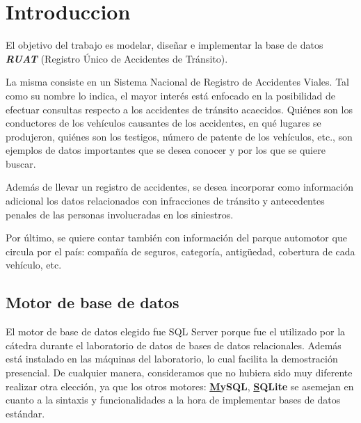 \section{Introduccion}

El objetivo del trabajo es modelar, dise\~nar e implementar la base de datos \textbf{\emph{RUAT}}
(Registro Único de Accidentes de Tránsito).

La misma consiste en un Sistema Nacional de Registro de Accidentes Viales. Tal como su nombre lo indica, el mayor interés
está enfocado en la posibilidad de efectuar consultas respecto a los accidentes de tránsito acaecidos. Quiénes son los
conductores de los vehículos causantes de los accidentes, en qué lugares se produjeron, quiénes son los testigos,
número de patente de los vehículos, etc., son ejemplos de datos importantes
que se desea conocer y por los que se quiere buscar.

Además de llevar un registro de accidentes, se desea incorporar como información adicional los datos relacionados con
infracciones de tránsito y antecedentes penales de las personas involucradas en los siniestros.

Por último, se quiere contar también con información del parque automotor que circula por el país: compa\~nía de seguros,
categoría, antigüedad, cobertura de cada vehículo, etc.

\subsection{Motor de base de datos}

El motor de base de datos elegido fue SQL Server porque fue el utilizado por la cátedra durante el laboratorio de datos
de bases de datos relacionales. Además está instalado en las máquinas del laboratorio, lo cual facilita la demostración
presencial. De cualquier manera, consideramos que no hubiera sido muy diferente realizar otra elección, ya que los otros
motores: \textbf{\underline MySQL}, \textbf{\underline SQLite} se asemejan en cuanto a la sintaxis y funcionalidades a la
hora de implementar bases de datos estándar.